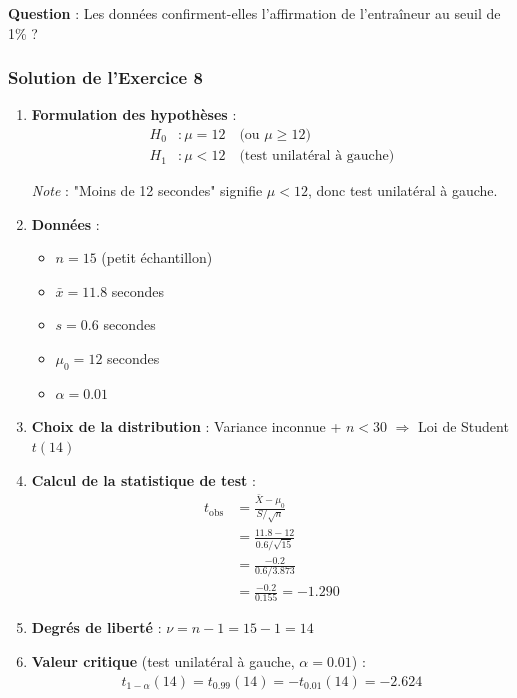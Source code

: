 \documentclass[11pt,a4paper]{article}
\begin{document}
\textbf{Question} : Les données confirment-elles l'affirmation de l'entraîneur au seuil de 1\% ?

\subsubsection*{Solution de l'Exercice 8}

\begin{enumerate}
    \item \textbf{Formulation des hypothèses} :
    \begin{align*}
    H_0 &: \mu = 12 \quad \text{(ou } \mu \geq 12\text{)} \\
    H_1 &: \mu < 12 \quad \text{(test unilatéral à gauche)}
    \end{align*}
    
    \textit{Note} : "Moins de 12 secondes" signifie $\mu < 12$, donc test unilatéral à gauche.
    
    \item \textbf{Données} :
    \begin{itemize}
        \item $n = 15$ (petit échantillon)
        \item $\bar{x} = 11.8$ secondes
        \item $s = 0.6$ secondes
        \item $\mu_0 = 12$ secondes
        \item $\alpha = 0.01$
    \end{itemize}
    
    \item \textbf{Choix de la distribution} : Variance inconnue + $n < 30$ $\Rightarrow$ Loi de Student $t(14)$
    
    \item \textbf{Calcul de la statistique de test} :
    \begin{align*}
    t_{\text{obs}} &= \frac{\bar{X} - \mu_0}{S/\sqrt{n}} \\
    &= \frac{11.8 - 12}{0.6/\sqrt{15}} \\
    &= \frac{-0.2}{0.6/3.873} \\
    &= \frac{-0.2}{0.155} = -1.290
    \end{align*}
    
    \item \textbf{Degrés de liberté} : $\nu = n - 1 = 15 - 1 = 14$
    
    \item \textbf{Valeur critique} (test unilatéral à gauche, $\alpha = 0.01$) :
    \begin{align*}
    t_{1-\alpha}(14) = t_{0.99}(14) = -t_{0.01}(14) = -2.624
    \end{align*}
    

\end{enumerate}
\end{document}
